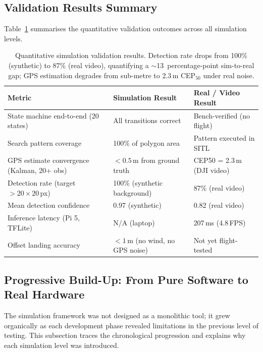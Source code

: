 \subsection{Validation Results Summary}\label{sec:val-results}

Table~\ref{tab:sim-val-results} summarises the quantitative validation outcomes across all simulation levels.

\begin{table}[H]
\centering
\caption{Quantitative simulation validation results.  Detection rate drops from 100\% (synthetic) to 87\% (real video), quantifying a ${\sim}$13~percentage-point sim-to-real gap; GPS estimation degrades from sub-metre to 2.3\,m CEP$_{50}$ under real noise.}
\label{tab:sim-val-results}
\small
\begin{tabular}{@{}lll@{}}
\toprule
\textbf{Metric} & \textbf{Simulation Result} & \textbf{Real / Video Result} \\
\midrule
State machine end-to-end (20 states) & All transitions correct & Bench-verified (no flight) \\
Search pattern coverage & 100\% of polygon area & Pattern executed in SITL \\
GPS estimate convergence (Kalman, 20+ obs) & $< 0.5$\,m from ground truth & CEP50 = 2.3\,m (DJI video) \\
Detection rate (target $> 20 \times 20$\,px) & 100\% (synthetic background) & 87\% (real video) \\
Mean detection confidence & 0.97 (synthetic) & 0.82 (real video) \\
Inference latency (Pi 5, TFLite) & N/A (laptop) & 207\,ms (4.8\,FPS) \\
Offset landing accuracy & $< 1$\,m (no wind, no GPS noise) & Not yet flight-tested \\
\bottomrule
\end{tabular}
\end{table}

\subsection{Progressive Build-Up: From Pure Software to Real Hardware}\label{sec:sim-buildup}

The simulation framework was not designed as a monolithic tool; it grew organically as each development phase revealed limitations in the previous level of testing.  This subsection traces the chronological progression and explains why each simulation level was introduced.

